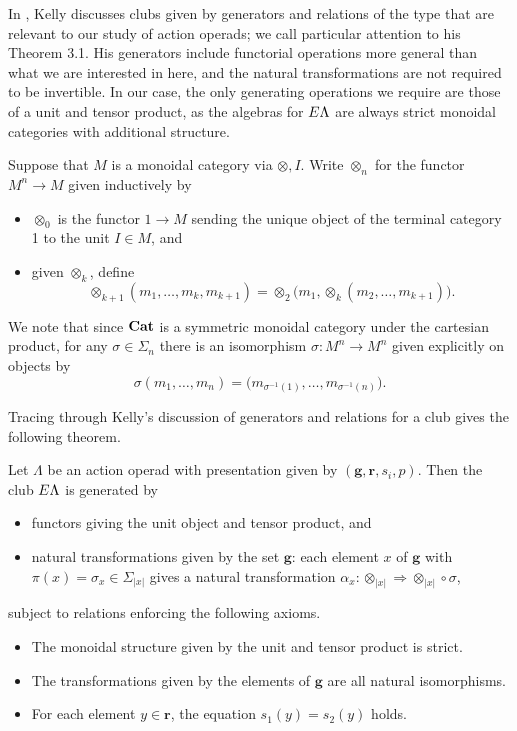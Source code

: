 In \cite[Section 3]{kelly_club1}, Kelly discusses clubs given by generators and relations of the type that are relevant to our study of action operads; we call particular attention to his Theorem 3.1. His generators include functorial operations more general than what we are interested in here, and the natural transformations are not required to be invertible. In our case, the only generating operations we require are those of a unit and tensor product, as the algebras for $E\Lambda$ are always strict monoidal categories with additional structure. 

\begin{nota}\label{nota:tensor-n}
Suppose that $M$ is a monoidal category via $\otimes, I$. Write $\otimes_n$ for the functor $M^n \to M$ given inductively by
\begin{itemize}
\item $\otimes_0$ is the functor $1 \to M$ sending the unique object of the terminal category 1 to the unit $I \in M$, and
\item given $\otimes_k$, define 
\[
\otimes_{k+1}(m_1, \ldots, m_k, m_{k+1}) = \otimes_2\big( m_1, \otimes_k(m_2, \ldots, m_{k+1}) \big).
\]
\end{itemize}
We note that since $\mathbf{Cat}$ is a symmetric monoidal category under the cartesian product, for any $\sigma \in \Sigma_n$ there is an isomorphism $\sigma \colon M^n \to M^n$ given explicitly on objects by
\[
\sigma(m_1, \ldots, m_n) = \big( m_{\sigma^{-1}(1)}, \ldots, m_{\sigma^{-1}(n)} \big). 
\]
\end{nota}

Tracing through Kelly's discussion of generators and relations for a club gives the following theorem.

\begin{thm}\label{thm:pres1}
Let $\Lambda$ be an action operad with presentation given by $(\mathbf{g},\mathbf{r}, s_{i}, p)$. Then the club $E\Lambda$ is generated by
\begin{itemize}
  \item functors giving the unit object and tensor product, and
  \item natural transformations given by the set $\mathbf{g}$:  each element $x$ of $\mathbf{g}$ with $\pi(x) = \sigma_{x} \in \Sigma_{|x|}$ gives a natural transformation $\alpha_x \colon \otimes_{|x|} \Rightarrow \otimes_{|x|} \circ \sigma$,
\end{itemize}
subject to relations enforcing the following axioms.
\begin{itemize}
  \item The monoidal structure given by the unit and tensor product is strict.
  \item The transformations given by the elements of $\mathbf{g}$ are all natural isomorphisms.
  \item For each element $y \in \mathbf{r}$, the equation $s_{1}(y) = s_{2}(y)$ holds.
\end{itemize}
\end{thm}

